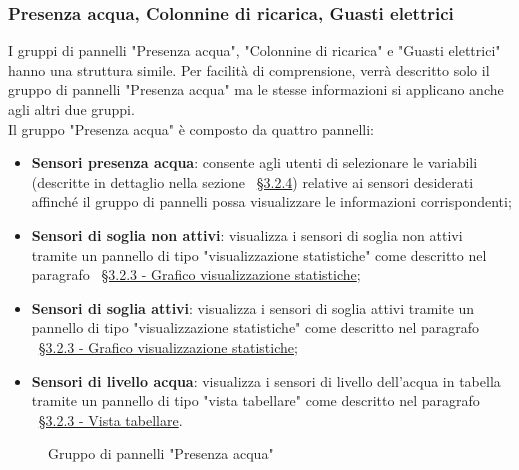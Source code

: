 \subsubsection{Presenza acqua, Colonnine di ricarica, Guasti elettrici}
I gruppi di pannelli "Presenza acqua", "Colonnine di ricarica" e "Guasti elettrici" hanno una struttura simile. Per facilità di comprensione, verrà descritto solo il gruppo di pannelli "Presenza acqua" ma le stesse informazioni si applicano anche agli altri due gruppi.\\
Il gruppo "Presenza acqua" è composto da quattro pannelli:
\begin{itemize}
    \item \textbf{Sensori presenza acqua}: consente agli utenti di selezionare le variabili (descritte in dettaglio nella sezione ~\hyperlink{par:gestione_variabili_panel}{\S3.2.4}) relative ai sensori desiderati affinché il gruppo di pannelli possa visualizzare le informazioni corrispondenti;
    \item \textbf{Sensori di soglia non attivi}: visualizza i sensori di soglia non attivi tramite un pannello di tipo "visualizzazione statistiche" come descritto nel paragrafo ~\hyperlink{par:visu_stat}{\S 3.2.3 - Grafico visualizzazione statistiche};
    \item \textbf{Sensori di soglia attivi}: visualizza i sensori di soglia attivi tramite un pannello di tipo "visualizzazione statistiche" come descritto nel paragrafo ~\hyperlink{par:visu_stat}{\S 3.2.3 - Grafico visualizzazione statistiche};
    \item \textbf{Sensori di livello acqua}: visualizza i sensori di livello dell'acqua in tabella tramite un pannello di tipo "vista tabellare" come descritto nel paragrafo ~\hyperlink{par:tabella}{\S3.2.3 - Vista tabellare}.
\end{itemize}
\begin{figure}[H]
    \centering
    \caption{Gruppo di pannelli "Presenza acqua"}
    \label{fig:my_label}
\end{figure}

